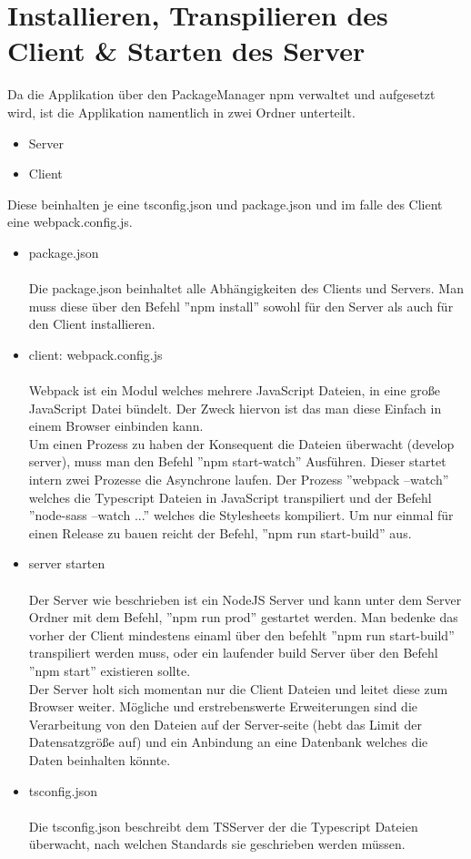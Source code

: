 \section{Installieren, Transpilieren des Client \& Starten des Server}
Da die Applikation über den PackageManager npm verwaltet und aufgesetzt wird, ist die Applikation namentlich in zwei Ordner unterteilt.
\begin{itemize}
    \item Server
    \item Client
\end{itemize}
Diese beinhalten je eine tsconfig.json und package.json und im falle des Client eine webpack.config.js.
\begin{itemize}
    \item package.json \\ \\
        Die package.json beinhaltet alle Abhängigkeiten des Clients und Servers. Man muss diese über den Befehl ''npm install''
        sowohl für den Server als auch für den Client installieren.
    \newpage
    \item client: webpack.config.js \\ \\
        Webpack ist ein Modul welches mehrere JavaScript Dateien, in eine große JavaScript Datei bündelt. Der Zweck hiervon ist das man
        diese Einfach in einem Browser einbinden kann. \\
        Um einen Prozess zu haben der Konsequent die Dateien überwacht (develop server), muss man den Befehl ''npm start-watch'' Ausführen. Dieser startet intern
        zwei Prozesse die Asynchrone laufen. Der Prozess ''webpack --watch'' welches die Typescript Dateien in JavaScript transpiliert und der Befehl
        ''node-sass --watch ...'' welches die Stylesheets kompiliert.
        Um nur einmal für einen Release zu bauen reicht der Befehl, ''npm run start-build'' aus.
    \item server starten \\ \\
        Der Server wie beschrieben ist ein NodeJS Server und kann unter dem Server Ordner mit dem Befehl, ''npm run prod'' gestartet werden.
        Man bedenke das vorher der Client mindestens einaml über den befehlt ''npm run start-build'' transpiliert werden muss, oder ein laufender
        build Server über den Befehl ''npm start'' existieren sollte. \\
        Der Server holt sich momentan nur die Client Dateien und leitet diese zum Browser weiter. Mögliche und erstrebenswerte Erweiterungen
        sind die Verarbeitung von den Dateien auf der Server-seite (hebt das Limit der Datensatzgröße auf) und ein Anbindung an eine
        Datenbank welches die Daten beinhalten könnte.
    \item tsconfig.json \\ \\
        Die tsconfig.json beschreibt dem TSServer der die Typescript Dateien überwacht, nach welchen Standards sie geschrieben werden
        müssen.
\end{itemize}
\newpage

